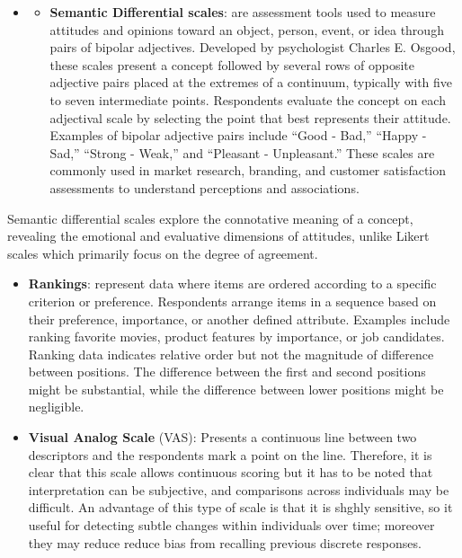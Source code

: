 \documentclass[
  letterpaper,
  DIV=11,
  numbers=noendperiod]{scrartcl}
\providecommand{\tightlist}{%
  \setlength{\itemsep}{0pt}\setlength{\parskip}{0pt}}\usepackage{longtable,booktabs,array}
\begin{document}
\begin{itemize}
\item
  \begin{itemize}
  \tightlist
  \item
    \textbf{Semantic Differential scales}: are assessment tools used to
    measure attitudes and opinions toward an object, person, event, or
    idea through pairs of bipolar adjectives. Developed by psychologist
    Charles E. Osgood, these scales present a concept followed by
    several rows of opposite adjective pairs placed at the extremes of a
    continuum, typically with five to seven intermediate points.
    Respondents evaluate the concept on each adjectival scale by
    selecting the point that best represents their attitude. Examples of
    bipolar adjective pairs include ``Good - Bad,'' ``Happy - Sad,''
    ``Strong - Weak,'' and ``Pleasant - Unpleasant.'' These scales are
    commonly used in market research, branding, and customer
    satisfaction assessments to understand perceptions and associations.
  \end{itemize}
\end{itemize}

Semantic differential scales explore the connotative meaning of a
concept, revealing the emotional and evaluative dimensions of attitudes,
unlike Likert scales which primarily focus on the degree of agreement.

\begin{itemize}
\tightlist
\item
  \textbf{Rankings}: represent data where items are ordered according to
  a specific criterion or preference. Respondents arrange items in a
  sequence based on their preference, importance, or another defined
  attribute. Examples include ranking favorite movies, product features
  by importance, or job candidates. Ranking data indicates relative
  order but not the magnitude of difference between positions. The
  difference between the first and second positions might be
  substantial, while the difference between lower positions might be
  negligible.
\end{itemize}

\begin{itemize}
\tightlist
\item
  \textbf{Visual Analog Scale} (VAS): Presents a continuous line between
  two descriptors and the respondents mark a point on the line.
  Therefore, it is clear that this scale allows continuous scoring but
  it has to be noted that interpretation can be subjective, and
  comparisons across individuals may be difficult. An advantage of this
  type of scale is that it is shghly sensitive, so it useful for
  detecting subtle changes within individuals over time; moreover they
  may reduce reduce bias from recalling previous discrete responses.
\end{itemize}
\end{document}

